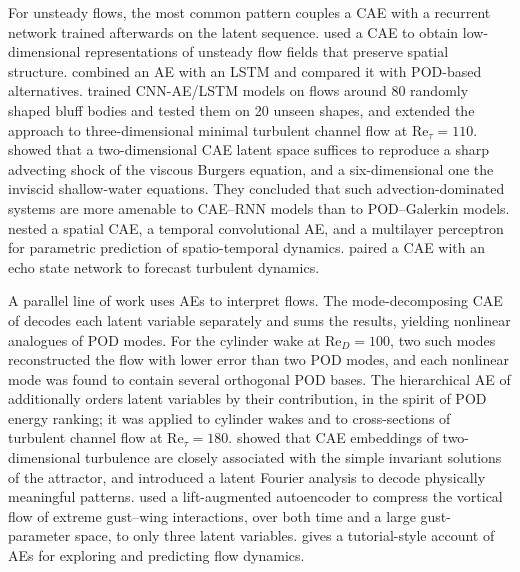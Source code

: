 For unsteady flows, the most common pattern couples a CAE with a recurrent
network trained afterwards on the latent sequence. \textcite{omata2019} used a
CAE to obtain low-dimensional representations of unsteady flow fields that
preserve spatial structure. \textcite{eivazi2020deep} combined an AE with an
LSTM and compared it with POD-based alternatives.
\textcite{hasegawa2020bluff} trained CNN-AE/LSTM models on flows around 80
randomly shaped bluff bodies and tested them on 20 unseen shapes, and
\textcite{nakamura2021channel} extended the approach to three-dimensional
minimal turbulent channel flow at $\mathrm{Re}_{\tau}=110$.
\textcite{maulik2021advection} showed that a two-dimensional CAE latent space
suffices to reproduce a sharp advecting shock of the viscous Burgers equation,
and a six-dimensional one the inviscid shallow-water equations. They concluded
that such advection-dominated systems are more amenable to CAE--RNN models than
to POD--Galerkin models.
\textcite{xu2020multilevel} nested a spatial CAE, a temporal convolutional AE,
and a multilayer perceptron for parametric prediction of spatio-temporal
dynamics. \textcite{racca2023caesn} paired a CAE with an echo state network to
forecast turbulent dynamics.

A parallel line of work uses AEs to interpret flows. The mode-decomposing CAE
of \textcite{murata2020mdcnn} decodes each latent variable separately and sums
the results, yielding nonlinear analogues of POD modes. For the cylinder wake
at $\mathrm{Re}_D=100$, two such modes reconstructed the flow with lower error
than two POD modes, and each nonlinear mode was found to contain several
orthogonal POD bases. The hierarchical AE of
\textcite{fukami2020hierarchical} additionally orders latent variables by their
contribution, in the spirit of POD energy ranking; it was applied to cylinder
wakes and to cross-sections of turbulent channel flow at $\mathrm{Re}_{\tau}=180$.
\textcite{page2021revealing} showed that CAE embeddings of two-dimensional
turbulence are closely associated with the simple invariant solutions of the
attractor, and introduced a latent Fourier analysis to decode physically
meaningful patterns. \textcite{fukami2023extreme} used a lift-augmented
autoencoder to compress the vortical flow of extreme gust--wing interactions,
over both time and a large gust-parameter space, to only three latent
variables. \textcite{agostini2020}
gives a tutorial-style account of AEs for exploring and predicting flow
dynamics.

